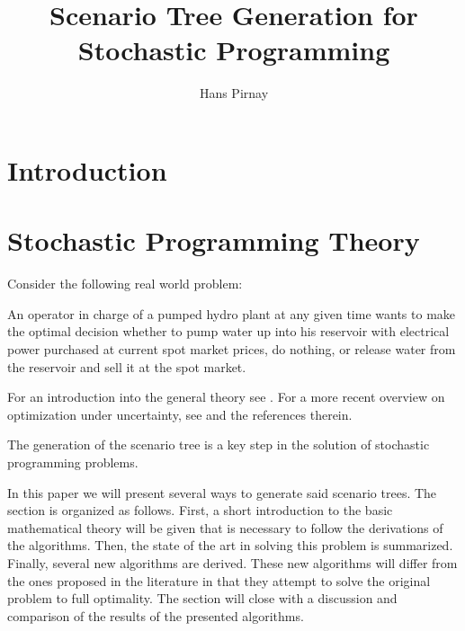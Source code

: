 \documentclass[12pt,onecolumn,headsepline,numbers=noenddot,bibliography=totoc,oneside,a4paper,fleqn,BCOR8mm] {scrartcl}
\begin{document}
\listoftodos
\newpage
\title{Scenario Tree Generation for Stochastic Programming}
\author{Hans Pirnay}
\maketitle
\tableofcontents
\newpage
\section{Introduction}
\section{Stochastic Programming Theory}
Consider the following real world problem:

An operator in charge of a pumped hydro plant at any given time wants to make the optimal decision whether to pump water up into his reservoir with electrical power purchased at current spot market prices, do nothing, or release water from the reservoir and sell it at the spot market. 

For an introduction into the general theory see \cite{Birge1997}. For a more recent overview on optimization under uncertainty, see \cite{Sahinidis2004} and the references therein.

The generation of the scenario tree is a key step in the solution of stochastic programming problems.

In this paper we will present several ways to generate said scenario trees. The section is organized as follows. First, a short introduction to the basic mathematical theory will be given that is necessary to follow the derivations of the algorithms. Then, the state of the art in solving this problem is summarized. Finally, several new algorithms are derived. These new algorithms will differ from the ones proposed in the literature in that they attempt to solve the original problem to full optimality. The section will close with a discussion and comparison of the results of the presented algorithms.





\newpage

%

\end{document}
